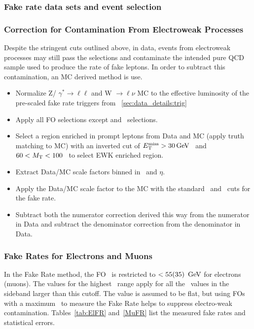         		\subsubsection{Fake rate data sets and event selection}
		
		
		
		
		
		
		
		
		
        		\subsubsection{Correction for Contamination From Electroweak Processes}
		
		Despite the stringent cuts outlined above, in data, events from electroweak processes may still pass the selections and contaminate the intended pure QCD sample used to produce the rate of fake leptons. In order to subtract this contamination, an MC derived method is use.
\begin{itemize}
\item Normalize Z/ $\gamma ^{*} \rightarrow \ell \ell$ and W $\rightarrow \ell \nu$ MC to  the effective luminosity of the pre-scaled fake rate triggers from ~\ref{sec:data_details:trig} 
\item Apply all FO selections except \MET and \Mt \ selections.
\item Select a region enriched in prompt leptons from Data and MC (apply truth matching to MC) with an inverted cut of $E_{\mathrm{T}}^{\text{miss}} > 30 \,\text{Ge\hspace{-.08em}V}$ \ and $60 < M_{\mathrm{T}} < 100$ \ to select EWK enriched region.
\item Extract Data/MC scale factors binned in \pt \ and $\eta$.
\item Apply the Data/MC scale factor to the MC with the standard \MET \ and \Mt \ cuts for the fake rate.
\item Subtract both the numerator correction derived this way from the numerator in Data and subtract the denominator correction from the denominator in Data.
\end{itemize}
		
		
        		\subsubsection{Fake Rates for Electrons and Muons}
		In the Fake Rate method, the FO \pt \ is restricted to $< 55(35) \ \,\text{Ge\hspace{-.08em}V}$ for electrons (muons). The values for the highest \pt \ range apply for all the \pt \ values in the sideband larger than this cutoff. The value is assumed to be flat, but using FOs with a maximum \pt \ to measure the Fake Rate helps to suppress electro-weak contamination. Tables~\ref{tab:ElFR} and~\ref{MuFR} list the measured fake rates and statistical errors.
		
